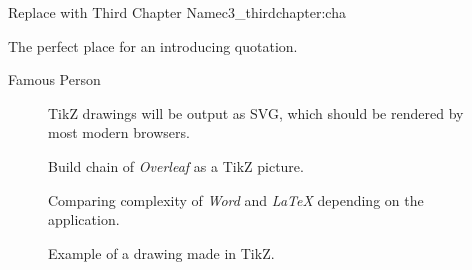 


\begin{chapterpage}{Replace with Third Chapter Name}{c3_thirdchapter:cha}

\begin{myquotation} The perfect place for an introducing quotation.\par\vspace*{15mm}
\mbox{}\hfill \emdash{}Famous Person
\par\end{myquotation}

\end{chapterpage}



\begin{figure}
\centering
{}
\caption{TikZ drawings will be output as SVG, which should be rendered by most modern browsers.}
\end{figure}


\begin{figure}
\centering

\caption{Build chain of \textit{Overleaf} as a TikZ picture.}
\end{figure}

\begin{figure}
\centering

\caption{Comparing complexity of \textit{Word} and \textit{LaTeX} depending on the application.}
\end{figure}

\begin{figure}
\centering

\caption{Example of a drawing made in TikZ.}
\end{figure}